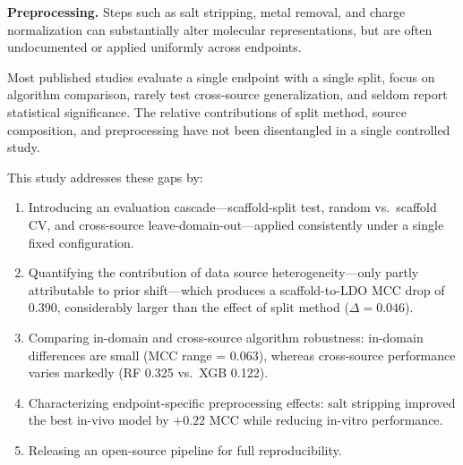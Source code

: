 \textbf{Preprocessing.} Steps such as salt stripping, metal removal, and charge 
normalization can substantially alter molecular 
representations,\cite{Fourches_2010,Fourches_2016} but are often undocumented or applied 
uniformly across endpoints.

Most published studies evaluate a single endpoint with a single split, focus on algorithm 
comparison,\cite{Yang_2019,Mayr_2016} rarely test cross-source generalization, and seldom 
report statistical significance.\cite{Demsar_2006} The relative contributions of split 
method, source composition, and preprocessing have not been disentangled in a single 
controlled study.

This study addresses these gaps by:
\begin{enumerate}
    \item Introducing an evaluation cascade---scaffold-split test, random vs.\ scaffold CV, 
    and cross-source leave-domain-out---applied consistently under a single fixed 
    configuration.

    \item Quantifying the contribution of data source heterogeneity---only partly 
    attributable to prior shift---which produces a scaffold-to-LDO MCC drop of 0.390, 
    considerably larger than the effect of split method 
    ($\Delta = 0.046$).

    \item Comparing in-domain and cross-source algorithm robustness: in-domain differences 
    are small (MCC range = 0.063), whereas cross-source performance varies markedly 
    (RF 0.325 vs.\ XGB 0.122).

    \item Characterizing endpoint-specific preprocessing effects: salt stripping improved 
    the best in-vivo model by $+0.22$ MCC while reducing in-vitro performance.

    \item Releasing an open-source pipeline for full reproducibility.
\end{enumerate}
